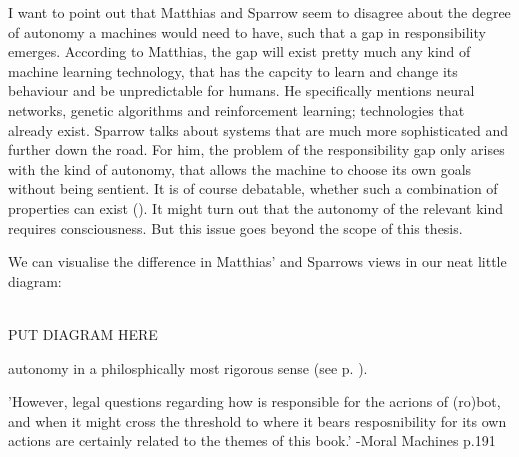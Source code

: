 \documentclass{article}
\begin{document}
I want to point out that Matthias and Sparrow seem to disagree about the degree of
autonomy a machines would need to have, such that a gap in responsibility
emerges. According to Matthias, the gap will exist pretty much any kind of
machine learning technology, that has the capcity to learn and change its
behaviour and be unpredictable for humans. He specifically mentions neural
networks, genetic algorithms and reinforcement learning; technologies that
already exist. Sparrow talks about systems that are much more sophisticated and
further down the road. For him, the problem of the responsibility gap only
arises with the kind of autonomy, that allows the machine to choose its own
goals without being sentient.\label{sparrowmatthiasdiff} 
It is of course debatable, whether such a combination of properties can exist
(\cite[p. 127]{champagne2015bridging}). It might turn out that the autonomy of
the relevant kind requires consciousness. But this issue goes beyond the scope
of this thesis.

We can visualise the difference in Matthias' and Sparrows views in our neat
little diagram:



\\

PUT DIAGRAM HERE

 autonomy in a philosphically most rigorous sense (see p.
\pageref{sparrow_autonomy}).

'However, legal questions regarding how is responsible for the acrions of
(ro)bot, and when it might cross the threshold to where it bears resposnibility
for its own actions are certainly related to the themes of this book.' -Moral
Machines p.191

\end{document}
